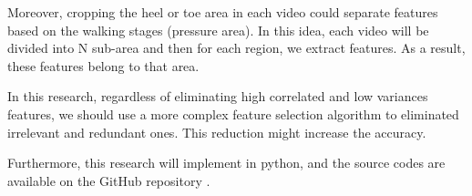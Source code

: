 Moreover, cropping the heel or toe area in each video could separate features based on the walking stages (pressure area). In this idea, each video will be divided into N sub-area and then for each region, we extract features. As a result, these features belong to that area.


In this research, regardless of eliminating high correlated and low variances features, we should use a more complex feature selection algorithm to eliminated irrelevant and redundant ones. This reduction might increase the accuracy.

 
Furthermore, this research will implement in python, and the source codes are available on the GitHub repository \cite{SKazemii/EE6563}. 

